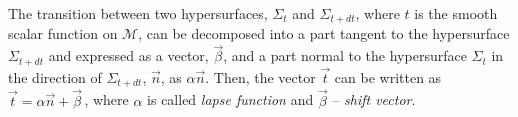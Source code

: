The transition between two hypersurfaces, $\Sigma_t$ and $\Sigma_{t+dt}$,
where $t$ is the smooth scalar function on $\mathcal{M}$, can be decomposed 
into a part tangent to the hypersurface $\Sigma_{t+dt}$ and expressed as a vector,
$\vec{\beta}$, and a part normal to the hypersurface $\Sigma_t$ in the direction of 
$\Sigma_{t+dt}$, $\vec{n}$, as $\alpha \vec{n}$.
%
Then, the vector $\vec{t}$ can be written as 
%
$\vec{t} = \alpha\vec{n}+\vec{\beta}\, $, 
%
where $\alpha$ is called \textit{lapse function} and $\vec{\beta}$ -- \textit{shift vector}.
%
%
%
% 

